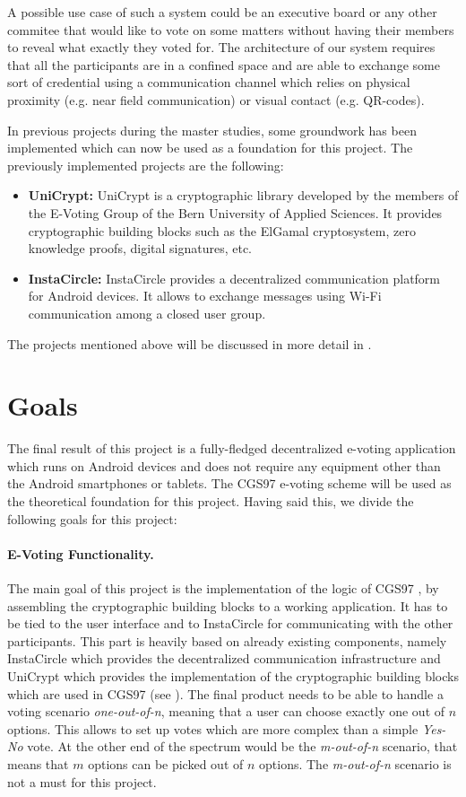 \documentclass[numbers=noenddot, abstract=on, a4paper, headsepline,
footsepline, oneside, draft=off]{scrreprt}
\newcommand{\myref}[1]{(see \Vref{#1})}
\begin{document}
A possible use case of such a system could be an executive board or any other
commitee that would like to vote on some matters without having their members
to reveal what exactly they voted for. The architecture of our system requires
that all the participants are in a confined space and are able to exchange some
sort of credential using a communication channel which relies on physical
proximity (e.g. near field communication) or visual contact (e.g. QR-codes).

In previous projects during the master studies, some groundwork has been
implemented which can now be used as a foundation for this project. The
previously implemented projects are the following:
\begin{itemize}
  \item \textbf{UniCrypt:} UniCrypt is a cryptographic library developed by the
  members of the E-Voting Group of the Bern University of Applied Sciences. It
  provides cryptographic building blocks such as the ElGamal cryptosystem, zero
  knowledge proofs, digital signatures, etc. 
  \item \textbf{InstaCircle: } InstaCircle provides a decentralized
  communication platform for Android devices. It allows to exchange messages
  using Wi-Fi communication among a closed user group.
\end{itemize}
The projects mentioned above will be discussed in more detail in .

\section{Goals}
\label{cha:goals}
The final result of this project is a fully-fledged decentralized e-voting
application which runs on Android devices and does not require any equipment
other than the Android smartphones or tablets. The CGS97 e-voting
scheme \cite{CGS97} will be used as the theoretical foundation for this project.
Having said this, we divide the following goals for this project:
\paragraph{E-Voting Functionality.}
The main goal of this project is the implementation of the logic of CGS97
\cite{CGS97}, by assembling the cryptographic building blocks to a working
application. It has to be tied to the user interface and to InstaCircle for
communicating with the other participants. This part is heavily based on already
existing components, namely InstaCircle which provides the decentralized
communication infrastructure and UniCrypt which provides the implementation of
the cryptographic building blocks which are used in CGS97
\myref{sec:buildingblocks}. The final product needs to be able to handle a
voting scenario \emph{one-out-of-n}, meaning that a user can choose exactly one
out of $n$ options. This allows to set up votes which are more complex
than a simple \emph{Yes-No} vote. At the other end of the spectrum would be the
\emph{m-out-of-n} scenario, that means that $m$ options can be picked out of $n$
options. The \emph{m-out-of-n} scenario is not a must for this project.
\end{document}
